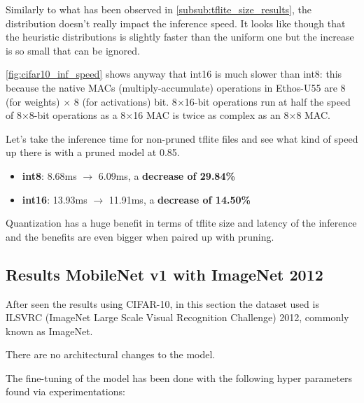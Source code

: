 Similarly to what has been observed in \autoref{subsub:tflite_size_results},
the distribution doesn't really impact the inference speed.
It looks like though that the heuristic distributions is slightly faster than
the uniform one but the increase is so small that can be ignored.

\autoref{fig:cifar10_inf_speed} shows anyway that int16 is much slower than
int8: this because the native MACs (multiply-accumulate) operations in
Ethos-U55 are 8 (for weights) $\times$ 8 (for activations) bit.
8$\times$16-bit operations run at half the speed of 8$\times$8-bit
operations as a 8$\times$16 MAC is twice as complex as an 8$\times$8 MAC\@.

Let's take the inference time for non-pruned tflite files and see what kind of
speed up there is with a pruned model at 0.85.

\begin{itemize}
    \item \textbf{int8}: 8.68ms $\rightarrow$ 6.09ms, a \textbf{decrease of 29.84\%}
    \item \textbf{int16}: 13.93ms $\rightarrow$ 11.91ms, a \textbf{decrease of 14.50\%}
\end{itemize}

Quantization has a huge benefit in terms of tflite size and latency of the
inference and the benefits are even bigger when paired up with pruning.

\subsection{Results MobileNet v1 with ImageNet 2012}
After seen the results using CIFAR-10, in this section the dataset used is
ILSVRC (ImageNet Large Scale Visual Recognition Challenge) 2012, commonly known
as ImageNet.

There are no architectural changes to the model.

The fine-tuning of the model has been done with the following hyper parameters
found via experimentations:


